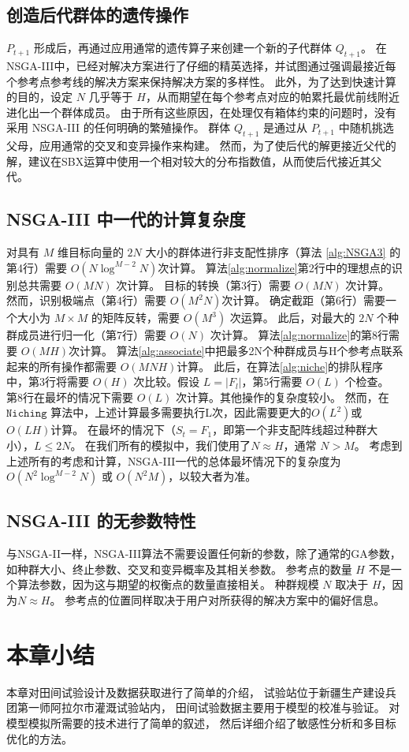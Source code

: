 \subsection{创造后代群体的遗传操作}
$P_{t+1}$ 形成后，再通过应用通常的遗传算子来创建一个新的子代群体 $Q_{t+1}$。%
在NSGA-III中，已经对解决方案进行了仔细的精英选择，并试图通过强调最接近每个参考点参考线的解决方案来保持解决方案的多样性。%
此外，为了达到快速计算的目的，设定 $N$ 几乎等于 $H$，从而期望在每个参考点对应的帕累托最优前线附近进化出一个群体成员。%
由于所有这些原因，在处理仅有箱体约束的问题时，没有采用 NSGA-III 的任何明确的繁殖操作。%
群体 $Q_{t+1}$ 是通过从 $P_{t+1}$ 中随机挑选父母，应用通常的交叉和变异操作来构建。%
然而，为了使后代的解更接近父代的解，建议在SBX运算中使用一个相对较大的分布指数值，从而使后代接近其父代。

\subsection{NSGA-III 中一代的计算复杂度}
对具有 $M$ 维目标向量的 $2N$ 大小的群体进行非支配性排序（算法 \ref{alg:NSGA3} 的第4行）需要 $O(N \log ^{M-2} N)$次计算\cite{kung1975}。%
算法\ref{alg:normalize}第2行中的理想点的识别总共需要 $O(MN)$ 次计算。%
目标的转换（第3行）需要 $O(MN)$ 次计算。%
然而，识别极端点（第4行）需要 $O(M^2N)$次计算。%
确定截距（第6行）需要一个大小为 $M \times M$ 的矩阵反转，需要 $O(M^3)$ 次运算。%
此后，对最大的 $2N$ 个种群成员进行归一化（第7行）需要 $O(N)$ 次计算。%
算法\ref{alg:normalize}的第8行需要 $O(MH)$次计算。%
算法\ref{alg:associate}中把最多2N个种群成员与H个参考点联系起来的所有操作都需要 $O(MNH)$计算。%
此后，在算法\ref{alg:niche}的排队程序中，第3行将需要 $O(H)$ 次比较。假设 $L=|F_l|$，第5行需要 $O(L)$ 个检查。%
第8行在最坏的情况下需要 $O(L)$ 次计算。其他操作的复杂度较小。%
然而，在 $\mathtt{Niching}$ 算法中，上述计算最多需要执行L次，因此需要更大的$O(L^2)$或$O(LH)$计算。%
在最坏的情况下（$S_t = F_1$，即第一个非支配阵线超过种群大小），$L \le 2N$。%
在我们所有的模拟中，我们使用了$N \approx H$，通常 $N > M$。%
考虑到上述所有的考虑和计算，NSGA-III一代的总体最坏情况下的复杂度为 $O(N^2 \log^{M-2} N)$ 或 $O(N^2M)$，以较大者为准。

\subsection{NSGA-III 的无参数特性}
与NSGA-II一样，NSGA-III算法不需要设置任何新的参数，除了通常的GA参数，如种群大小、终止参数、交叉和变异概率及其相关参数。%
参考点的数量 $H$ 不是一个算法参数，因为这与期望的权衡点的数量直接相关。%
种群规模 $N$ 取决于 $H$，因为$N \approx H$。%
参考点的位置同样取决于用户对所获得的解决方案中的偏好信息。

\section{本章小结}
本章对田间试验设计及数据获取进行了简单的介绍，%
试验站位于新疆生产建设兵团第一师阿拉尔市灌溉试验站内，%
田间试验数据主要用于模型的校准与验证。%
对模型模拟所需要的技术进行了简单的叙述，%
然后详细介绍了敏感性分析和多目标优化的方法。
